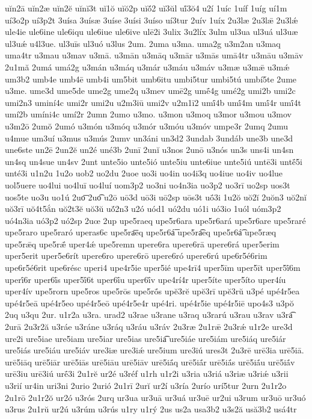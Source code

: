 {uĭn2ā
uĭn2æ
uĭn2ĕ
uĭnĭ3t
uĭ1ŏ
uĭŏ2p
uĭŏ́2
uĭ3ŭl
uĭ́3ŏ4
u2í
1uíc
1uíf
1uíg
uí1m
uí3o2p
uí3p2t
3uísa
3uísæ
3uíse
3uísi
3uíso
uí3tur
2uív
1uíx
2u3læ
2u3lǣ
2u3lǽ
ule4ie
ule6ine
ule6iqu
ule6iue
ule6ive
ulē2i
3ulix
3u2líx
3ulm
ul3ua
ul3uá
ul3uæ
ul3uǽ
u4l3ue.
ul3uīs
ul3uó
u3lus
2um.
2uma
u3ma.
uma2g
u3m2an
u3maq
uma4tr
u3mau
u3mav
u3mā.
u3mān
u3māq
u3mār
u3mās
umā4tr
u3māu
u3māv
2u1mă
2umá
umá2g
u3mán
u3máq
u3már
u3máu
u3máv
u3mæ
u3mǣ
u3mǽ
um3b2
umb4e
umb4ē
umb4i
um5bit
umb6itu
umbi5tur
umbi5tú
umbí5te
2ume
u3me.
ume3d
ume5de
ume2g
ume2q
u3mev
umē2g
umḗ4g
umé2g
umi2b
umi2c
umi2n3
uminí4c
umi2r
umi2u
u2m3iū
umi2v
u2m1ī2
umī́4b
umī́4m
umī́4r
umī́4t
umí2b
umíni4c
umí2r
2umn
2umo
u3mo.
u3mon
u3moq
u3mor
u3mou
u3mov
u3m2ō
2umŏ
2umó
u3món
u3móq
u3mór
u3móu
u3móv
umpe3r
2umq
2umu
u4mue
um3uí
u3mus
u3mús
2umv
un3áni
un3d2
3undab
3undáb
une3b
une3d
une6ste
un2ē
2un2ĕ
un2é
uné3b
2unī
2unĭ
u3nos
2unō
u3nós
un3s
uns4i
un4sn
un4sq
un4sue
un4sv
2unt
unte5io
unte5ió
unte5iu
unte6iue
unte5iú
untē3i
untḗ5i
unté3i
u1n2u
1u2o
uob2
uo2du
2uoe
uo3i
uo4in
uo4i3q
uo4iue
uo4iv
uo4lue
uol5uere
uo4lui
uo4luī
uo4luí
uom3p2
uo3ni
uo4n3ia
uo3p2
uo3rī
uo2sp
uos3t
uos5te
uo3u
uo1ú
2uo͞
2uo͡
u2ō
uō3d
uō3i
uō2sp
uōs3t
uṓ3i
1u2ŏ
uŏ2ĭ
2uŏn3
uŏ2nĭ
uŏ3rī
uŏ4t5ắn
uŏ2t3ĕ
uŏ3ŭ
uŏ́2n3
u2ó
uód1
uó2du
uó1i
uó3io
1uól
uóm3p2
uó4n3ia
uó3p2
uó2sp
2uœ
2up
upe5raeq
upe5r6ara
upe5r6ará
upe5r6are
upe5raré
upe5raro
upe5raró
uperas6c
upe5ra͞eq
upe5r6á͞
upe5ra͡eq
upe5r6á͡
upe5ræq
upe5rǣq
upe5rǣ́
uper4ǽ
upe5remn
upere6ra
upere6rā
upere6rá
uper5erim
uper5erit
uper5e6rít
upere6ro
upere6rō
upere6ró
upere6rú
upe6r5é6rim
upe6r5é6rit
upe6résc
uperi4
upe4r5ie
uper5ié
upe4rī4
uper5īm
uper5īt
uper5ī́6m
uperī́6r
uper6ī́s
uper5ī́6t
uper6ī́u
uper6ī́v
upe4rí4r
uper5íte
uper5íto
uper4íu
uper4ív
upe5rorn
upe5ros
upe5rōs
upe5rṓs
upĕ3rĕ
upĕ3rī
upĕ3rŭ
u3pé
upé4r5ea
upé4r5eā
upé4r5eo
upé4r5eō
upé4r5e4r
upé4ri.
upé4r5ie
upé4r5iē
upo4s3
u3pŏ
2uq
u3qu
2ur.
u1r2a
u3ra.
urad2
u3rae
u3rane
u3raq
u3rarú
u3rau
u3rav
u3ra͡
2urā
2u3r2ă
u3ráe
u3ráne
u3ráq
u3ráu
u3ráv
2u3ræ
2u1rǣ
2u3rǽ
u1r2e
ure3d
ure2i
ure5iae
ure5iam
ure5iar
ure5ias
ure5ia͡
ure5iáe
ure5iám
ure5iáq
ure5iár
ure5iás
ure5iáu
ure5iáv
ure3iæ
ure3iǽ
ure5ium
ure3iú
ures3t
2u3rē
urē3ia
urē5iā.
urē5iāq
urē5iār
urē5iās
urē5iāu
urē5iāv
urē5iā́q
urē5iā́r
urē5iā́s
urē5iā́u
urē5iā́v
urē3iu
urē3iú
urḗ3i
2u1rĕ
ur2é
u3réf
u1rh
u1r2i
u3ria
u3riá
u3riæ
u3riǽ
u3rii
u3rií
ur4in
uri3ni
2urio
2urió
2u1rī
2urĭ
ur2í
u3ría
2urío
urí5tur
2urn
2u1r2o
2u1rō
2u1r2ŏ
ur2ó
u3rós
2urq
ur3ua
ur3uā
ur3uá
ur3uē
ur2ui
u3rum
ur3uō
ur3uó
u3rus
2u1rŭ
ur2ú
u3rúm
u3rús
u1ry
u1rý
2us
us2a
usa3b2
u3s2ă
usă3b2
usá4tr
}

